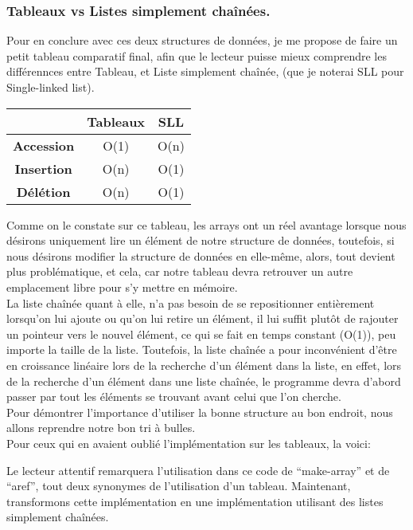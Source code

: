 \documentclass[a4paper, 12pt]{article}
\numberwithin{equation}{subsection}
\begin{document}
\subsubsection{Tableaux vs Listes simplement chaînées.}
Pour en conclure avec ces deux structures de données, je me propose de faire un petit tableau comparatif final, afin que le lecteur puisse mieux comprendre les différennces entre Tableau, et Liste simplement chaînée, (que je noterai SLL pour Single-linked list).
\begin{table}[H]
  \centering
  \begin{tabular}{|c|c|c|}
    \hline & Tableaux & SLL \\
    \hline {\bf Accession} & O(1) & O(n) \\
    \hline {\bf Insertion} & O(n) & O(1) \\
    \hline {\bf Délétion}  & O(n) & O(1) \\
    \hline
  \end{tabular}
\end{table} \smallskip
Comme on le constate sur ce tableau, les arrays ont un réel avantage lorsque nous désirons uniquement lire un élément de notre structure de données, toutefois, si nous désirons modifier la structure de données en elle-même, alors, tout devient plus problématique, et cela, car notre tableau devra retrouver un autre emplacement libre pour s'y mettre en mémoire. \\
La liste chaînée quant à elle, n'a pas besoin de se repositionner entièrement lorsqu'on lui ajoute ou qu'on lui retire un élément, il lui suffit plutôt de rajouter un pointeur vers le nouvel élément, ce qui se fait en temps constant (O(1)), peu importe la taille de la liste. Toutefois, la liste chaînée a pour inconvénient d'être en croissance linéaire lors de la recherche d'un élément dans la liste, en effet, lors de la recherche d'un élément dans une liste chaînée, le programme devra d'abord passer par tout les éléments se trouvant avant celui que l'on cherche. \\
Pour démontrer l'importance d'utiliser la bonne structure au bon endroit, nous allons reprendre notre bon tri à bulles. \\
Pour ceux qui en avaient oublié l'implémentation sur les tableaux, la voici:

Le lecteur attentif remarquera l'utilisation dans ce code de ``make-array'' et de ``aref'', tout deux synonymes de l'utilisation d'un tableau. Maintenant, transformons cette implémentation en une implémentation utilisant des listes simplement chaînées. \\
\end{document}
